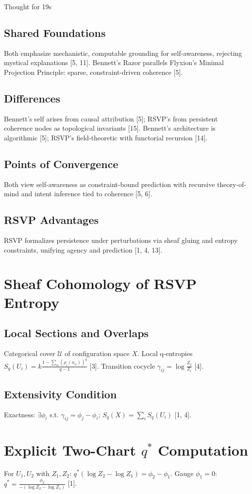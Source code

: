 Thought for 19s\documentclass{article}
\begin{document}
\subsection{Shared Foundations}
Both emphasize mechanistic, computable grounding for self-awareness, rejecting mystical explanations [5, 11]. Bennett's Razor parallels Flyxion’s Minimal Projection Principle: sparse, constraint-driven coherence [5].
\subsection{Differences}
Bennett's self arises from causal attribution [5]; RSVP's from persistent coherence nodes as topological invariants [15]. Bennett's architecture is algorithmic [5]; RSVP's field-theoretic with functorial recursion [14].
\subsection{Points of Convergence}
Both view self-awareness as constraint-bound prediction with recursive theory-of-mind and intent inference tied to coherence [5, 6].
\subsection{RSVP Advantages}
RSVP formalizes persistence under perturbations via sheaf gluing and entropy constraints, unifying agency and prediction [1, 4, 13].
\appendix
\section{Sheaf Cohomology of RSVP Entropy}
\subsection{Local Sections and Overlaps}
Categorical cover $\mathcal{U}$ of configuration space $X$. Local q-entropies $S_q(U_i) = k \frac{1 - \sum_\alpha (\rho_i(x_\alpha))^q}{q-1}$ [3]. Transition cocycle $\gamma_{ij} = \log \frac{Z_j}{Z_i}$ [4].
\subsection{Extensivity Condition}
Exactness: $\exists \phi_i$ s.t. $\gamma_{ij} = \phi_j - \phi_i$; $S_q(X) = \sum_i S_q(U_i)$ [1, 4].
\section{Explicit Two-Chart $q^*$ Computation}
For $U_1, U_2$ with $Z_1, Z_2$: $q^* (\log Z_2 - \log Z_1) = \phi_2 - \phi_1$. Gauge $\phi_1 = 0$: $q^* = \frac{\phi_2}{-(\log Z_2 - \log Z_1)}$ [1].
\end{document}
